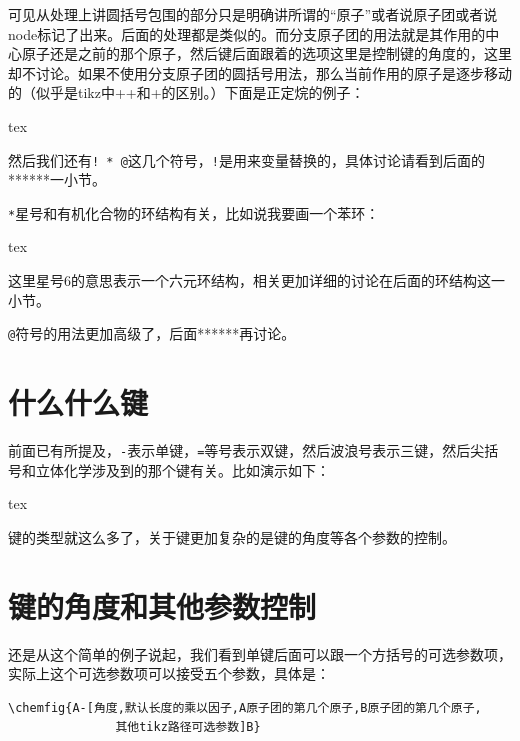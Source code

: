 \documentclass[12pt,oneside]{book}
\begin{document}
\begin{common-format}

可见从处理上讲圆括号包围的部分只是明确讲所谓的“原子”或者说原子团或者说node标记了出来。后面的处理都是类似的。而分支原子团的用法就是其作用的中心原子还是之前的那个原子，然后键后面跟着的选项这里是控制键的角度的，这里却不讨论。如果不使用分支原子团的圆括号用法，那么当前作用的原子是逐步移动的（似乎是tikz中++和+的区别。）下面是正定烷的例子：
\begin{tcbcode}{tex}
\end{tcbcode}


然后我们还有\verb+! * @+这几个符号，\verb+!+是用来变量替换的，具体讨论请看到后面的******一小节。

\verb+*+星号和有机化合物的环结构有关，比如说我要画一个苯环：
\begin{tcbcode}{tex}
\end{tcbcode}


这里星号6的意思表示一个六元环结构，相关更加详细的讨论在后面的环结构这一小节。

\verb+@+\@{}符号的用法更加高级了，后面******再讨论。

\section{什么什么键}
\label{sec:什么什么键}
前面已有所提及，\verb+-+表示单键，\verb+=+等号表示双键，然后波浪号表示三键，然后尖括号和立体化学涉及到的那个键有关。比如演示如下：
\begin{tcbcode}{tex}
\end{tcbcode}








键的类型就这么多了，关于键更加复杂的是键的角度等各个参数的控制。

\section{键的角度和其他参数控制}
还是从这个简单的例子说起，我们看到单键后面可以跟一个方括号的可选参数项，实际上这个可选参数项可以接受五个参数，具体是：
\begin{Verbatim}
\chemfig{A-[角度,默认长度的乘以因子,A原子团的第几个原子,B原子团的第几个原子,
               其他tikz路径可选参数]B}
\end{Verbatim}


\end{common-format}
\end{document}
